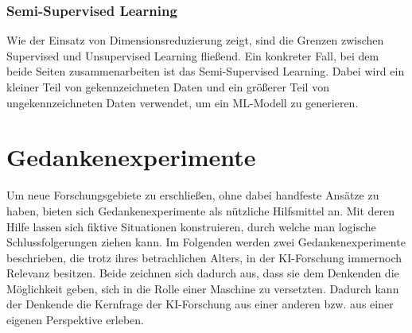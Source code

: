 \documentclass[12pt,german,ngerman]{report}
\begin{document}
    \subsection{Semi-Supervised Learning}
        Wie der Einsatz von Dimensionsreduzierung zeigt, sind die Grenzen
        zwischen Supervised und Unsupervised Learning fließend.
        Ein konkreter Fall, bei dem beide Seiten zusammenarbeiten ist das Semi-Supervised Learning.
        Dabei wird ein kleiner Teil von gekennzeichneten Daten und ein größerer Teil von ungekennzeichneten Daten verwendet,
        um ein ML-Modell zu generieren.\cite{semisupervised2021mlmastery}


            

\chapter{Gedankenexperimente}
    Um neue Forschungsgebiete zu erschließen, ohne dabei handfeste Ansätze zu haben,
    bieten sich Gedankenexperimente als nützliche Hilfsmittel an.
    Mit deren Hilfe lassen sich fiktive Situationen konstruieren, durch welche man logische Schlussfolgerungen ziehen kann.
    Im Folgenden werden zwei Gedankenexperimente beschrieben, die trotz ihres betrachlichen Alters, in der KI-Forschung
    immernoch Relevanz besitzen. Beide zeichnen sich dadurch aus, dass sie dem Denkenden die Möglichkeit geben, sich in die
    Rolle einer Maschine zu versetzten. Dadurch kann der Denkende die Kernfrage der KI-Forschung aus einer anderen
    bzw. aus einer eigenen Perspektive erleben. 
\end{document}
